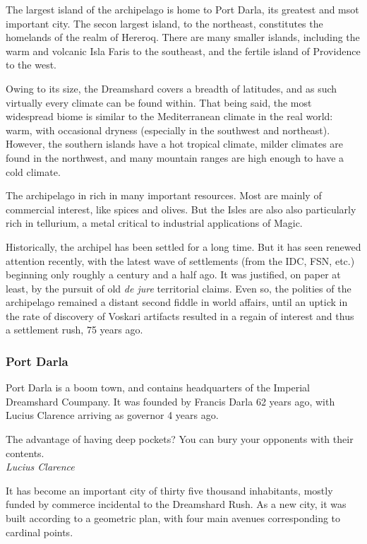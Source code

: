 The largest island of the archipelago is home to Port Darla, its greatest and msot important city. The secon largest island, to the northeast, constitutes the homelands of the realm of Hereroq. There are many smaller islands, including the warm and volcanic Isla Faris to the southeast, and the fertile island of Providence to the west.

Owing to its size, the Dreamshard covers a breadth of latitudes, and as such virtually every climate can be found within. That being said, the most widespread biome is similar to the Mediterranean climate in the real world: warm, with occasional dryness (especially in the southwest and northeast). However, the southern islands have a hot tropical climate, milder climates are found in the northwest, and many mountain ranges are high enough to have a cold climate.

The archipelago in rich in many important resources. Most are mainly of commercial interest, like spices and olives. But the Isles are also also particularly rich in tellurium, a metal critical to industrial applications of Magic.

Historically, the archipel has been settled for a long time. But it has seen renewed attention recently, with the latest wave of settlements (from the IDC, FSN, etc.) beginning only roughly a century and a half ago. It was justified, on paper at least, by the pursuit of old \textit{de jure} territorial claims. Even so, the polities of the archipelago remained a distant second fiddle in world affairs, until an uptick in the rate of discovery of Voskari artifacts resulted in a regain of interest and thus a settlement rush, 75 years ago.



\subsubsection{Port Darla}

Port Darla is a boom town, and contains headquarters of the Imperial Dreamshard Coumpany. It was founded by Francis Darla 62 years ago, with Lucius Clarence arriving as governor 4 years ago. 


\begin{rpg-quotebox}
    The advantage of having deep pockets? You can bury your opponents with their contents. \\ \textendash \textit{Lucius Clarence}
    \end{rpg-quotebox}
 
It has become an important city of thirty five thousand inhabitants, mostly funded by commerce incidental to the Dreamshard Rush. As a new city, it was built according to a geometric plan, with four main avenues corresponding to cardinal points.


